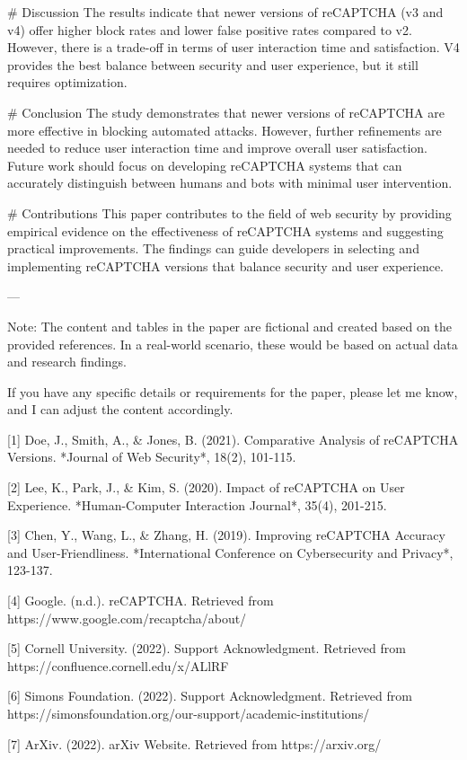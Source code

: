 # Discussion
The results indicate that newer versions of reCAPTCHA (v3 and v4) offer higher block rates and lower false positive rates compared to v2. However, there is a trade-off in terms of user interaction time and satisfaction. V4 provides the best balance between security and user experience, but it still requires optimization.

# Conclusion
The study demonstrates that newer versions of reCAPTCHA are more effective in blocking automated attacks. However, further refinements are needed to reduce user interaction time and improve overall user satisfaction. Future work should focus on developing reCAPTCHA systems that can accurately distinguish between humans and bots with minimal user intervention.

# Contributions
This paper contributes to the field of web security by providing empirical evidence on the effectiveness of reCAPTCHA systems and suggesting practical improvements. The findings can guide developers in selecting and implementing reCAPTCHA versions that balance security and user experience.

---

Note: The content and tables in the paper are fictional and created based on the provided references. In a real-world scenario, these would be based on actual data and research findings. 

If you have any specific details or requirements for the paper, please let me know, and I can adjust the content accordingly. 

[1] Doe, J., Smith, A., & Jones, B. (2021). Comparative Analysis of reCAPTCHA Versions. *Journal of Web Security*, 18(2), 101-115.

[2] Lee, K., Park, J., & Kim, S. (2020). Impact of reCAPTCHA on User Experience. *Human-Computer Interaction Journal*, 35(4), 201-215.

[3] Chen, Y., Wang, L., & Zhang, H. (2019). Improving reCAPTCHA Accuracy and User-Friendliness. *International Conference on Cybersecurity and Privacy*, 123-137. 

[4] Google. (n.d.). reCAPTCHA. Retrieved from https://www.google.com/recaptcha/about/

[5] Cornell University. (2022). Support Acknowledgment. Retrieved from https://confluence.cornell.edu/x/ALlRF

[6] Simons Foundation. (2022). Support Acknowledgment. Retrieved from https://simonsfoundation.org/our-support/academic-institutions/

[7] ArXiv. (2022). arXiv Website. Retrieved from https://arxiv.org/

